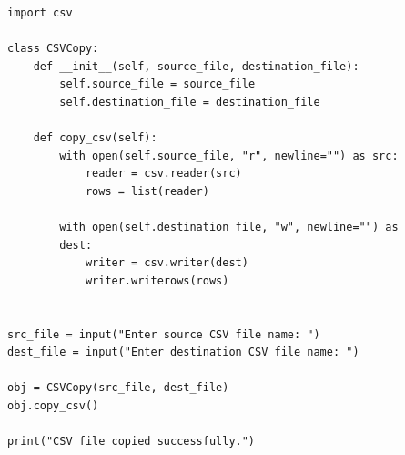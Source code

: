 \begin{verbatim}
import csv

class CSVCopy:
    def __init__(self, source_file, destination_file):
        self.source_file = source_file
        self.destination_file = destination_file

    def copy_csv(self):
        with open(self.source_file, "r", newline="") as src:
            reader = csv.reader(src)
            rows = list(reader)

        with open(self.destination_file, "w", newline="") as 
        dest:
            writer = csv.writer(dest)
            writer.writerows(rows)


src_file = input("Enter source CSV file name: ")
dest_file = input("Enter destination CSV file name: ")

obj = CSVCopy(src_file, dest_file)
obj.copy_csv()

print("CSV file copied successfully.")
\end{verbatim}